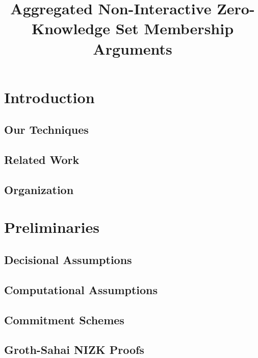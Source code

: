 \documentclass[11pt]{llncs}
\author{\vspace*{-.5cm}}
\institute{\vspace*{-.8cm}}
\title{Aggregated Non-Interactive Zero-Knowledge Set Membership Arguments}
\begin{document}

\maketitle
\begin{abstract}
    
\end{abstract} 

\section{Introduction}
    
    \subsection{Our Techniques}\label{sec:techniques}
        
    \subsection{Related Work}
        
    \subsection{Organization}
        

\section{Preliminaries} \label{secc:prelim}
    
    \subsection{Decisional Assumptions} 
         \label{sec:dec-ass}
            \subsection{Computational Assumptions}\label{sec:comp-assump}
        
    \subsection{Commitment Schemes} \label{sec:comm}
         
    \subsection{Groth-Sahai NIZK Proofs} \label{GSproofs} \label{sec:gs}
        
\end{document}
